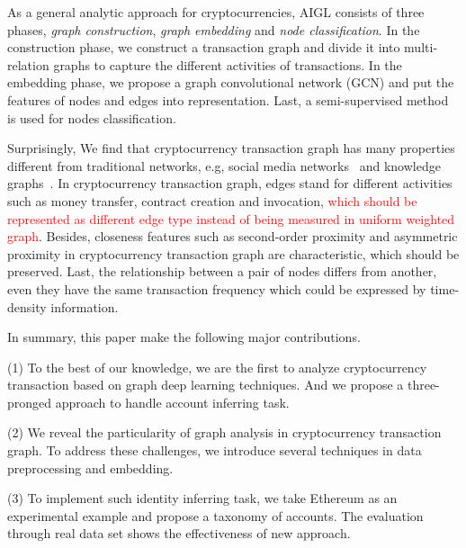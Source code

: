 As a general analytic approach for cryptocurrencies, AIGL consists of three phases, \emph{graph construction}, \emph{graph embedding} and \emph{node classification}. In the construction phase, we construct a transaction graph and divide it into multi-relation graphs to capture the different activities of transactions. In the embedding phase, we propose a graph convolutional network (GCN) and put the features of nodes and edges into representation. Last, a semi-supervised method is used for nodes classification.

Surprisingly, We find that cryptocurrency transaction graph has many properties different from traditional networks, e.g, social media networks~\cite{geng2015learning} and knowledge graphs~\cite{bollacker2008freebase}. In cryptocurrency transaction graph, edges stand for different activities such as money transfer, contract creation and invocation, \textcolor{red}{which should be represented as different edge type instead of being measured in uniform weighted graph}. Besides, closeness features such as second-order proximity and asymmetric proximity in cryptocurrency transaction graph are characteristic, which should be preserved. Last, the relationship between a pair of nodes differs from another, even they have the same transaction frequency which could be expressed by time-density information.

In summary, this paper make the following major contributions.

(1) To the best of our knowledge, we are the first to analyze cryptocurrency transaction based on graph deep learning techniques. And we propose a three-pronged approach to handle account inferring task.

(2) We reveal the particularity of graph analysis in cryptocurrency transaction graph. To address these challenges, we introduce several techniques in data preprocessing and embedding.

(3) To implement such identity inferring task, we take Ethereum as an experimental example and propose a taxonomy of accounts. The evaluation through real data set shows the effectiveness of new approach.




